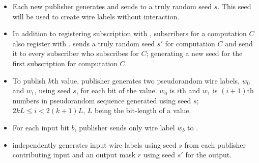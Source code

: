 \begin{figure*}[h]
\begin{mdframed}[style=myframe]

\initialize
\begin{itemize}[leftmargin=*,itemsep=4pt,topsep=4pt]
 
	\item Each new publisher generates and sends to \garbler a truly random seed
		$s$. This seed will be used to create wire labels without interaction.

\end{itemize}

\subscribe
\begin{itemize}[leftmargin=*,itemsep=4pt,topsep=4pt]

	\item In addition to registering subscription with \broker, subscribers for a
		computation $C$ also register with \garbler. \garbler sends a truly
		random seed $s'$ for computation $C$ and send it to every subscriber who
		subscribes for $C$; generating a new seed for the first subscription for
		computation $C$.
		
\end{itemize}

\publish
\begin{itemize}[leftmargin=*,itemsep=4pt,topsep=4pt]
		
	\item To publish $k$th value, publisher generates two pseudorandom wire
		labels, $w_0$ and $w_1$, using seed $s$, for each bit of the value.  $w_0$
		is $i$th and $w_1$ is $(i+1)$th numbers in pseudorandom sequence generated
		using seed $s$; $2kL \leq i < 2(k+1)L$, $L$ being the bit-length of a
		value.

	\item For each input bit $b$, publisher sends only wire label $w_b$ to
		\broker.

\end{itemize}

\process
\begin{itemize}[leftmargin=*,itemsep=4pt,topsep=4pt]

	\item \garbler independently generates input wire labels using seed $s$ from
		each publisher contributing input and an output mask $r$ using seed $s'$
		for the output.

\end{itemize}

\vspace{4pt}


\end{mdframed}
\end{figure*}
